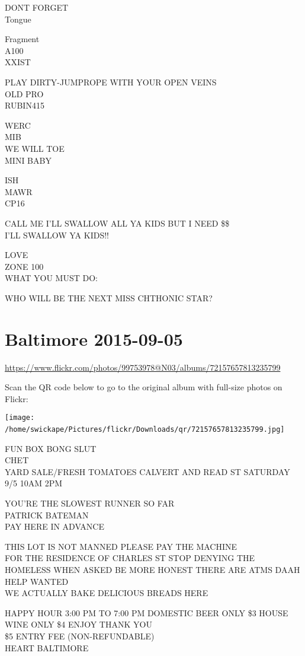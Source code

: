 \documentclass[10pt,letterpaper]{article}
\begin{document}
DONT FORGET\\
Tongue

Fragment\\
A100\\
XXIST

PLAY DIRTY{-}JUMPROPE WITH YOUR OPEN VEINS\\
OLD PRO\\
RUBIN415

WERC\\
MIB\\
WE WILL TOE\\
MINI BABY

ISH\\
MAWR\\
CP16

CALL ME I'LL SWALLOW ALL YA KIDS BUT I NEED \$\$\\
I'LL SWALLOW YA KIDS!!

LOVE\\
ZONE 100\\
WHAT YOU MUST DO:

WHO WILL BE THE NEXT MISS CHTHONIC STAR?
\

\section*{Baltimore 2015-09-05}

\url{https://www.flickr.com/photos/99753978@N03/albums/72157657813235799}

Scan the QR code below to go to the original album with full-size photos on Flickr:

\texttt{[image: /home/swickape/Pictures/flickr/Downloads/qr/72157657813235799.jpg]}
\

FUN BOX BONG SLUT\\
CHET\\
YARD SALE/FRESH TOMATOES CALVERT AND READ ST SATURDAY 9/5 10AM 2PM

YOU'RE THE SLOWEST RUNNER SO FAR\\
PATRICK BATEMAN\\
PAY HERE IN ADVANCE

THIS LOT IS NOT MANNED PLEASE PAY THE MACHINE\\
FOR THE RESIDENCE OF CHARLES ST STOP DENYING THE HOMELESS WHEN ASKED BE MORE HONEST THERE ARE ATMS DAAH\\
HELP WANTED\\
WE ACTUALLY BAKE DELICIOUS BREADS HERE

HAPPY HOUR 3:00 PM TO 7:00 PM DOMESTIC BEER ONLY \$3 HOUSE WINE ONLY \$4 ENJOY THANK YOU\\
\$5 ENTRY FEE (NON{-}REFUNDABLE)\\
HEART BALTIMORE
\end{document}
